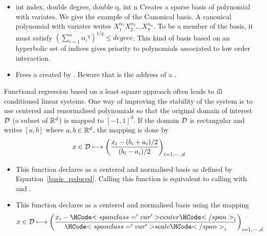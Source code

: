 \begin{itemize}
\item  {}
  {int index, double degree, double q, int n}
  \sshortdescribe Creates a sparse basis of polynomial with 
  variates. We give the example of the Canonical basis. A canonical polynomial
  with  variates writes $X_1^{\alpha_1} X_2^{\alpha_2} \dots
  X_n^{\alpha_n}$. To be a member of the basis, it must satisfy $\left(\sum_{i=1}^n
    {\alpha_i}^q \right)^{1/q} \leq degree$. This kind of basis based on an
  hyperbolic set of indices gives priority to polynomials associated to low
  order interaction.

\item  {}
  \sshortdescribe Frees a  created by
  . Beware that  is the address of a
  \ptr.

\end{itemize}


Functional regression based on a least square approach often leads to ill
conditioned linear systems. One way of improving the stability of the system is to
use centered and renormalised polynomials so that the original domain of interest
${\mathcal D}$ (a subset of ${\mathbb R}^d$) is mapped to $[-1,1]^d$. If the domain ${\mathcal D}$ is
rectangular and writes $[a, b]$ where $a,b \in {\mathbb R}^d$, the mapping is done by 
\begin{equation}
  \label{basis_reduced}
  x \in {\mathcal D} \longmapsto \left(\frac{x_i - (b_i+a_i)/2}{(b_i - a_i)/2}
  \right)_{i=1,\cdots,d}
\end{equation}
\begin{itemize}
\item {}
  \sshortdescribe This function declares  as a centered and normalised basis
  as defined by Equation~\ref{basis_reduced}. Calling this function is equivalent to
  calling  with  and
  .
\item {}
  \sshortdescribe This function declares  as a centered and normalised basis
  using the mapping
  \begin{equation*}
    x \in \cD \longmapsto \left(\frac{x_i - \var{center}_i }{\var{scale}_i}
    \right)_{i=1,\cdots,d}
  \end{equation*}
\end{itemize}


